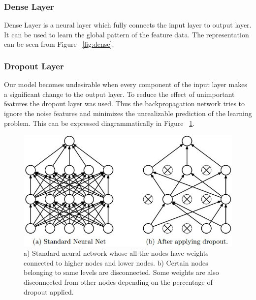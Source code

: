   \subsubsection{Dense Layer}
  Dense Layer is a neural layer which fully connects the input layer to output layer. It can be used to learn the global pattern of the feature data. The representation can be seen from Figure ~\ref{fig:dense}.
  
  
  \subsubsection{Dropout Layer}
  Our model becomes undesirable when every component of the input layer makes a significant change to the output layer. To reduce the effect of unimportant features the dropout layer was used. Thus the backpropagation network tries to ignore the noise features and minimizes the unrealizable prediction of the learning problem. This can be expressed diagrammatically in Figure ~\ref{fig:dropout}.
  \begin{figure}
    [H] \centering
    \captionsetup{justification=justified}
    \includegraphics[width=.5\linewidth]{mainmatter/3-Methodology/images/dropout.jpeg}
    \caption[Dropout Layer]{a) Standard neural network whose all the nodes have weights connected to higher nodes and lower nodes. 
    b) Certain nodes belonging to same levels are disconnected. Some weights are also disconnected from other nodes depending on the percentage of dropout applied.}
    \label{fig:dropout}
  
  \end{figure}
  
